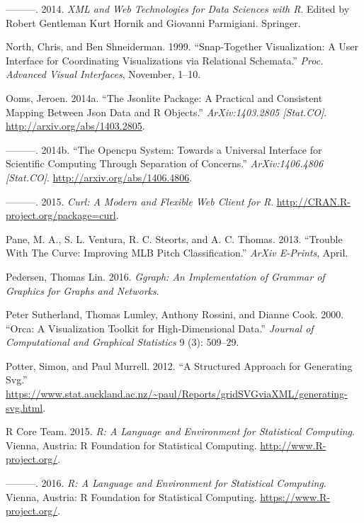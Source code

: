 \documentclass[12pt,]{isuthesis}
\begin{document}
\hypertarget{ref-nolan-lang}{}
---------. 2014. \emph{XML and Web Technologies for Data Sciences with
R}. Edited by Robert Gentleman Kurt Hornik and Giovanni Parmigiani.
Springer.

\hypertarget{ref-North:1999vi}{}
North, Chris, and Ben Shneiderman. 1999. ``Snap-Together Visualization:
A User Interface for Coordinating Visualizations via Relational
Schemata.'' \emph{Proc. Advanced Visual Interfaces}, November, 1--10.

\hypertarget{ref-jsonlite}{}
Ooms, Jeroen. 2014a. ``The Jsonlite Package: A Practical and Consistent
Mapping Between Json Data and R Objects.'' \emph{ArXiv:1403.2805
{[}Stat.CO{]}}. \url{http://arxiv.org/abs/1403.2805}.

\hypertarget{ref-opencpu}{}
---------. 2014b. ``The Opencpu System: Towards a Universal Interface
for Scientific Computing Through Separation of Concerns.''
\emph{ArXiv:1406.4806 {[}Stat.CO{]}}.
\url{http://arxiv.org/abs/1406.4806}.

\hypertarget{ref-curl}{}
---------. 2015. \emph{Curl: A Modern and Flexible Web Client for R}.
\url{http://CRAN.R-project.org/package=curl}.

\hypertarget{ref-curve}{}
Pane, M. A., S. L. Ventura, R. C. Steorts, and A. C. Thomas. 2013.
``Trouble With The Curve: Improving MLB Pitch Classification.''
\emph{ArXiv E-Prints}, April.

\hypertarget{ref-ggraph}{}
Pedersen, Thomas Lin. 2016. \emph{Ggraph: An Implementation of Grammar
of Graphics for Graphs and Networks}.

\hypertarget{ref-orca}{}
Peter Sutherland, Thomas Lumley, Anthony Rossini, and Dianne Cook. 2000.
``Orca: A Visualization Toolkit for High-Dimensional Data.''
\emph{Journal of Computational and Graphical Statistics} 9 (3): 509--29.

\hypertarget{ref-gridSVGreport}{}
Potter, Simon, and Paul Murrell. 2012. ``A Structured Approach for
Generating Svg.''
\url{https://www.stat.auckland.ac.nz/~paul/Reports/gridSVGviaXML/generating-svg.html}.

\hypertarget{ref-RCore}{}
R Core Team. 2015. \emph{R: A Language and Environment for Statistical
Computing}. Vienna, Austria: R Foundation for Statistical Computing.
\url{http://www.R-project.org/}.

\hypertarget{ref-base}{}
---------. 2016. \emph{R: A Language and Environment for Statistical
Computing}. Vienna, Austria: R Foundation for Statistical Computing.
\url{https://www.R-project.org/}.
\end{document}
